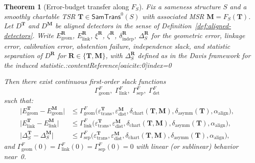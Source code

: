 \documentclass[11pt]{article}
\newtheorem{theorem}{Theorem}
\newcommand{\SamTrans}{\mathsf{SamTrans}}
\begin{document}
\begin{theorem}[Error-budget transfer along $F_S$]
\label{thm:error-transfer-F}
Fix a sameness structure $S$ and a smoothly chartable TSR
$\mathbf{T} \in \SamTrans^0(S)$ with associated MSR
$\mathbf{M} = F_S(\mathbf{T})$.  Let $D^{\mathbf{T}}$ and $D^{\mathbf{M}}$
be aligned detectors in the sense of
Definition~\ref{def:aligned-detectors}.  Write
$E_{\mathrm{geom}}^{\mathbf{R}}$, $E_{\mathrm{link}}^{\mathbf{R}}$,
$\xi^{\mathbf{R}}$, $\zeta^{\mathbf{R}}$, $\delta_{\mathrm{indep}}^{\mathbf{R}}$,
$\Delta_S^{\mathbf{R}}$ for the geometric error, linkage error,
calibration error, abstention failure, independence slack, and statistic
separation of $D^{\mathbf{R}}$ for $\mathbf{R} \in \{\mathbf{T},
\mathbf{M}\}$, with $\Delta_S^{\mathbf{R}}$ defined as in the Davis
framework for the induced statistic.:contentReference[oaicite:0]{index=0}

Then there exist continuous \emph{first-order} slack functions
\[
\Gamma^{F}_{\mathrm{geom}},\;
\Gamma^{F}_{\mathrm{link}},\;
\Gamma^{F}_{\mathrm{sep}},\;
\Gamma^{F}_{\mathrm{det}}
\]
such that:
\begin{align}
\bigl|
  E_{\mathrm{geom}}^{\mathbf{T}} - E_{\mathrm{geom}}^{\mathbf{M}}
\bigr|
&\le
\Gamma^{F}_{\mathrm{geom}}
  \bigl(
    \varepsilon_{\mathrm{trans}}^{\mathbf{T}},
    \varepsilon_{\mathrm{dist}}^{\mathbf{M}},
    \delta_{\mathrm{chart}}(\mathbf{T}, \mathbf{M}),
    \delta_{\mathrm{asymm}}(\mathbf{T}),
    \alpha_{\mathrm{align}}
  \bigr),
\label{eq:F-geom-equivalence}
\\[0.25em]
\bigl|
  E_{\mathrm{link}}^{\mathbf{T}} - E_{\mathrm{link}}^{\mathbf{M}}
\bigr|
&\le
\Gamma^{F}_{\mathrm{link}}
  \bigl(
    \varepsilon_{\mathrm{trans}}^{\mathbf{T}},
    \varepsilon_{\mathrm{dist}}^{\mathbf{M}},
    \delta_{\mathrm{chart}}(\mathbf{T}, \mathbf{M}),
    \delta_{\mathrm{asymm}}(\mathbf{T}),
    \alpha_{\mathrm{align}}
  \bigr),
\label{eq:F-link-equivalence}
\\[0.25em]
\bigl|
  \Delta_S^{\mathbf{T}} - \Delta_S^{\mathbf{M}}
\bigr|
&\le
\Gamma^{F}_{\mathrm{sep}}
  \bigl(
    \varepsilon_{\mathrm{trans}}^{\mathbf{T}},
    \varepsilon_{\mathrm{dist}}^{\mathbf{M}},
    \delta_{\mathrm{chart}}(\mathbf{T}, \mathbf{M}),
    \delta_{\mathrm{asymm}}(\mathbf{T}),
    \alpha_{\mathrm{align}}
  \bigr),
\label{eq:F-sep-equivalence}
\end{align}
and $\Gamma^{F}_{\mathrm{geom}}(0) = \Gamma^{F}_{\mathrm{link}}(0)
= \Gamma^{F}_{\mathrm{sep}}(0) = 0$ with linear (or sublinear) behavior
near~0.


\end{theorem}
\end{document}
